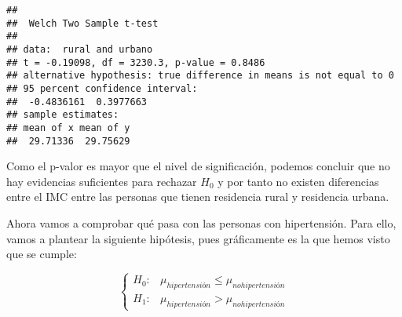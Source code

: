 \documentclass[
]{article}
\newenvironment{Shaded}{\begin{snugshade}}{\end{snugshade}}
\newcommand{\AttributeTok}[1]{\textcolor[rgb]{0.77,0.63,0.00}{#1}}
\newcommand{\CommentTok}[1]{\textcolor[rgb]{0.56,0.35,0.01}{\textit{#1}}}
\newcommand{\ConstantTok}[1]{\textcolor[rgb]{0.00,0.00,0.00}{#1}}
\newcommand{\FloatTok}[1]{\textcolor[rgb]{0.00,0.00,0.81}{#1}}
\newcommand{\FunctionTok}[1]{\textcolor[rgb]{0.00,0.00,0.00}{#1}}
\newcommand{\NormalTok}[1]{#1}
\newcommand{\OtherTok}[1]{\textcolor[rgb]{0.56,0.35,0.01}{#1}}
\newcommand{\SpecialCharTok}[1]{\textcolor[rgb]{0.00,0.00,0.00}{#1}}
\newcommand{\StringTok}[1]{\textcolor[rgb]{0.31,0.60,0.02}{#1}}
\begin{document}
\begin{Shaded}
\end{Shaded}

\begin{verbatim}
## 
##  Welch Two Sample t-test
## 
## data:  rural and urbano
## t = -0.19098, df = 3230.3, p-value = 0.8486
## alternative hypothesis: true difference in means is not equal to 0
## 95 percent confidence interval:
##  -0.4836161  0.3977663
## sample estimates:
## mean of x mean of y 
##  29.71336  29.75629
\end{verbatim}

Como el p-valor es mayor que el nivel de significación, podemos concluir
que no hay evidencias suficientes para rechazar \(H_{0}\) y por tanto no
existen diferencias entre el IMC entre las personas que tienen
residencia rural y residencia urbana.

Ahora vamos a comprobar qué pasa con las personas con hipertensión. Para
ello, vamos a plantear la siguiente hipótesis, pues gráficamente es la
que hemos visto que se cumple:

\[ \left\{ \begin{array}{lc}
             H_{0}: & \mu_{hipertensión} \leq \mu_{no hipertensión} \\
             H_{1}: & \mu_{hipertensión} > \mu_{no hipertensión}
             \end{array}
   \right. \]
\end{document}
